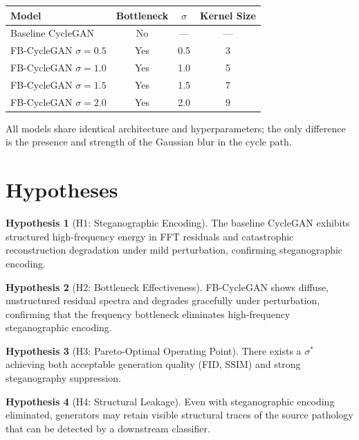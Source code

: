 \documentclass[11pt,a4paper]{article}
\theoremstyle{definition}
\newtheorem{hypothesis}{Hypothesis}
\begin{document}
\begin{center}
\begin{tabular}{lccc}
\toprule
Model & Bottleneck & $\sigma$ & Kernel Size \\
\midrule
Baseline CycleGAN & No & --- & --- \\
FB-CycleGAN $\sigma=0.5$ & Yes & 0.5 & 3 \\
FB-CycleGAN $\sigma=1.0$ & Yes & 1.0 & 5 \\
FB-CycleGAN $\sigma=1.5$ & Yes & 1.5 & 7 \\
FB-CycleGAN $\sigma=2.0$ & Yes & 2.0 & 9 \\
\bottomrule
\end{tabular}
\end{center}

All models share identical architecture and hyperparameters; the only difference is the presence and strength of the Gaussian blur in the cycle path.

\section{Hypotheses}

\begin{hypothesis}[H1: Steganographic Encoding]
The baseline CycleGAN exhibits structured high-frequency energy in FFT residuals and catastrophic reconstruction degradation under mild perturbation, confirming steganographic encoding.
\end{hypothesis}

\begin{hypothesis}[H2: Bottleneck Effectiveness]
FB-CycleGAN shows diffuse, unstructured residual spectra and degrades gracefully under perturbation, confirming that the frequency bottleneck eliminates high-frequency steganographic encoding.
\end{hypothesis}

\begin{hypothesis}[H3: Pareto-Optimal Operating Point]
There exists a $\sigma^*$ achieving both acceptable generation quality (FID, SSIM) and strong steganography suppression.
\end{hypothesis}

\begin{hypothesis}[H4: Structural Leakage]
Even with steganographic encoding eliminated, generators may retain visible structural traces of the source pathology that can be detected by a downstream classifier.
\end{hypothesis}
\end{document}
